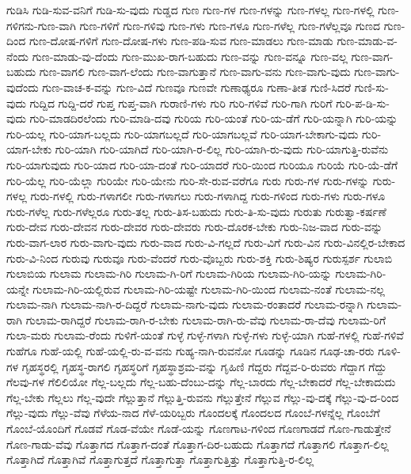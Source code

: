 {ಗುಡಿಸಿ
ಗುಡಿ-ಸುವ-ವನಿಗೆ
ಗುಡಿ-ಸು-ವುದು
ಗುಡ್ಡದ
ಗುಣ
ಗುಣ-ಗಳ
ಗುಣ-ಗಳನ್ನು
ಗುಣ-ಗಳಲ್ಲ
ಗುಣ-ಗಳಲ್ಲಿ
ಗುಣ-ಗಳಿಗನು-ಗುಣ-ವಾಗಿ
ಗುಣ-ಗಳಿಗೆ
ಗುಣ-ಗಳಿವು
ಗುಣ-ಗಳು
ಗುಣ-ಗಳೂ
ಗುಣ-ಗಳೆಲ್ಲ
ಗುಣ-ಗಳೆಲ್ಲವೂ
ಗುಣದ
ಗುಣ-ದಿಂದ
ಗುಣ-ದೋಷ-ಗಳಿಗೆ
ಗುಣ-ದೋಷ-ಗಳು
ಗುಣ-ಪಡಿ-ಸುವ
ಗುಣ-ಮಾಡಲು
ಗುಣ-ಮಾಡು
ಗುಣ-ಮಾಡು-ವ-ನೆಂದು
ಗುಣ-ಮಾಡು-ವು-ದೆಂದು
ಗುಣ-ಮುಖ-ರಾಗ-ಬಹುದು
ಗುಣ-ವನ್ನು
ಗುಣ-ವನ್ನೂ
ಗುಣ-ವಲ್ಲ
ಗುಣ-ವಾಗ-ಬಹುದು
ಗುಣ-ವಾಗಲಿ
ಗುಣ-ವಾಗ-ಲೆಂದು
ಗುಣ-ವಾಗುತ್ತಾನೆ
ಗುಣ-ವಾಗು-ವನು
ಗುಣ-ವಾಗು-ವುದು
ಗುಣ-ವಾಗು-ವುದೆಂದು
ಗುಣ-ವಾಚ-ಕ-ವನ್ನು
ಗುಣ-ವಿದೆ
ಗುಣವೂ
ಗುಣವೇ
ಗುಣಾಢ್ಯರೂ
ಗುಣಾ-ತೀತ
ಗುಣಿ-ಸಿದರೆ
ಗುಣಿ-ಸು-ವುದು
ಗುದ್ದಿದ
ಗುದ್ದಿ-ದರೆ
ಗುಪ್ತ
ಗುಪ್ತ-ವಾಗಿ
ಗುರಾಣಿ-ಗಳು
ಗುರಿ
ಗುರಿ-ಗಳಿವೆ
ಗುರಿ-ಗಾಗಿ
ಗುರಿಗೆ
ಗುರಿ-ಪ-ಡಿ-ಸು-ವುದು
ಗುರಿ-ಮಾಡದಿರಲೆಂದು
ಗುರಿ-ಮಾಡಿ-ದವು
ಗುರಿಯ
ಗುರಿ-ಯಂತೆ
ಗುರಿ-ಯ-ಡೆಗೆ
ಗುರಿ-ಯನ್ನಾಗಿ
ಗುರಿ-ಯನ್ನು
ಗುರಿ-ಯಲ್ಲ
ಗುರಿ-ಯಾಗ-ಬಲ್ಲದು
ಗುರಿ-ಯಾಗಬಲ್ಲದೆ
ಗುರಿ-ಯಾಗಬಲ್ಲವೆ
ಗುರಿ-ಯಾಗ-ಬೇಕಾಗು-ವುದು
ಗುರಿ-ಯಾಗ-ಬೇಕು
ಗುರಿ-ಯಾಗಿ
ಗುರಿ-ಯಾಗಿದೆ
ಗುರಿ-ಯಾಗಿ-ರ-ಲಿಲ್ಲ
ಗುರಿ-ಯಾಗಿ-ರು-ವುದು
ಗುರಿ-ಯಾಗುತ್ತಿ-ರುವೆನು
ಗುರಿ-ಯಾಗುವುದು
ಗುರಿ-ಯಾದ
ಗುರಿ-ಯಾ-ದಂತೆ
ಗುರಿ-ಯಾದರೆ
ಗುರಿ-ಯಿಂದ
ಗುರಿಯೂ
ಗುರಿಯೆ
ಗುರಿ-ಯೆ-ಡೆಗೆ
ಗುರಿ-ಯೆಲ್ಲ
ಗುರಿ-ಯೆಲ್ಲಾ
ಗುರಿಯೇ
ಗುರಿ-ಯೇನು
ಗುರಿ-ಸೇ-ರುವ-ವರೆಗೂ
ಗುರು
ಗುರು-ಗಳ
ಗುರು-ಗಳನ್ನು
ಗುರು-ಗಳಲ್ಲ
ಗುರು-ಗಳಲ್ಲಿ
ಗುರು-ಗಳಾಗಲೀ
ಗುರು-ಗಳಾಗಲು
ಗುರು-ಗಳಾಗಿದ್ದ
ಗುರು-ಗಳಿಂದ
ಗುರು-ಗಳು
ಗುರು-ಗಳೂ
ಗುರು-ಗಳೆಲ್ಲ
ಗುರು-ಗಳೆಲ್ಲರೂ
ಗುರು-ತಲ್ಲ
ಗುರು-ತಿಸ-ಬಹುದು
ಗುರು-ತಿ-ಸು-ವುದು
ಗುರುತು
ಗುರುತ್ವಾ-ಕರ್ಷಣೆ
ಗುರು-ದೇವ
ಗುರು-ದೇವನ
ಗುರು-ದೇವರ
ಗುರು-ದೇವರು
ಗುರು-ದೊರಕ-ಬೇಕು
ಗುರು-ನಿಜ-ವಾದ
ಗುರು-ವನ್ನು
ಗುರು-ವಾಗ-ಲಾರ
ಗುರು-ವಾಗು-ವುದು
ಗುರು-ವಾದ
ಗುರು-ವಿ-ಗಲ್ಲದೆ
ಗುರು-ವಿಗೆ
ಗುರು-ವಿನ
ಗುರು-ವಿನಲ್ಲಿರ-ಬೇಕಾದ
ಗುರು-ವಿ-ನಿಂದ
ಗುರುವು
ಗುರುವೂ
ಗುರು-ವೆಂದರೆ
ಗುರು-ವೊಬ್ಬರು
ಗುರು-ಶಕ್ತಿ
ಗುರು-ಶಿಷ್ಯರ
ಗುರುಸ್ಪರ್ಶ
ಗುಲಾಬಿ
ಗುಲಾಬಿಯ
ಗುಲಾಮ
ಗುಲಾಮ-ಗಿರಿ
ಗುಲಾಮ-ಗಿ-ರಿಗೆ
ಗುಲಾಮ-ಗಿರಿಯ
ಗುಲಾಮ-ಗಿರಿ-ಯನ್ನು
ಗುಲಾಮ-ಗಿರಿ-ಯನ್ನೇ
ಗುಲಾಮ-ಗಿರಿ-ಯಲ್ಲಿರುವ
ಗುಲಾಮ-ಗಿರಿ-ಯಷ್ಟೇ
ಗುಲಾಮ-ಗಿರಿ-ಯಿಂದ
ಗುಲಾಮ-ನಂತೆ
ಗುಲಾಮ-ನಲ್ಲ
ಗುಲಾಮ-ನಾಗಿ
ಗುಲಾಮ-ನಾಗಿ-ರ-ದಿದ್ದರೆ
ಗುಲಾಮ-ನಾಗು-ವುದು
ಗುಲಾಮ-ರಂತಾದರೆ
ಗುಲಾಮ-ರನ್ನಾಗಿ
ಗುಲಾಮ-ರಾಗಿ
ಗುಲಾಮ-ರಾಗಿದ್ದರೆ
ಗುಲಾಮ-ರಾಗಿ-ರ-ಬೇಕು
ಗುಲಾಮ-ರಾಗಿ-ರು-ವೆವು
ಗುಲಾಮ-ರಾ-ದೆವು
ಗುಲಾಮ-ರಿಗೆ
ಗುಲಾ-ಮರು
ಗುಲಾಮ-ರೆಂದು
ಗುಳಿಗೆ-ಯಂತೆ
ಗುಳ್ಳೆ
ಗುಳ್ಳೆ-ಗಳಾಗಿ
ಗುಳ್ಳೆ-ಗಳು
ಗುಳ್ಳೆ-ಯಾಗಿ
ಗುಹೆ-ಗಳಲ್ಲಿ
ಗುಹೆ-ಗಳಿವೆ
ಗುಹೆಗೂ
ಗುಹೆ-ಯಲ್ಲಿ
ಗುಹೆ-ಯಲ್ಲಿ-ರು-ವ-ವನು
ಗುಹ್ಯ-ನಾಗಿ-ರುವನೋ
ಗೂಡನ್ನು
ಗೂಡಿನ
ಗೂಢ-ಚಾ-ರರು
ಗೂಳಿ-ಗಳ
ಗೃಹಸ್ಥರಲ್ಲಿ
ಗೃಹಸ್ಥ-ರಾಗಲಿ
ಗೃಹಸ್ಥರಿಗೆ
ಗೃಹಸ್ಥಾಶ್ರಮ-ವನ್ನು
ಗೃಹಿಣಿ
ಗೆದ್ದರು
ಗೆದ್ದವ-ರಿ-ರುವರು
ಗೆದ್ದಾಗ
ಗೆದ್ದು
ಗೆಲವು-ಗಳ
ಗೆಲಿಲಿಯೋ
ಗೆಲ್ಲ-ಬಲ್ಲದು
ಗೆಲ್ಲ-ಬಹು-ದೆಂಬು-ದನ್ನು
ಗೆಲ್ಲ-ಬಾರದು
ಗೆಲ್ಲ-ಬೇಕಾದರೆ
ಗೆಲ್ಲ-ಬೇಕಾದುದು
ಗೆಲ್ಲ-ಬೇಕು
ಗೆಲ್ಲಲು
ಗೆಲ್ಲ-ವುದೇ
ಗೆಲ್ಲುತ್ತಾನೆ
ಗೆಲ್ಲುತ್ತಿ-ರುವನು
ಗೆಲ್ಲುತ್ತೇನೆ
ಗೆಲ್ಲುವ
ಗೆಲ್ಲು-ವು-ದಕ್ಕೆ
ಗೆಲ್ಲು-ವು-ದ-ರಿಂದ
ಗೆಲ್ಲು-ವುದು
ಗೆಲ್ಲು-ವೆವು
ಗೆಳೆಯ-ನಾದ
ಗೆಳೆ-ಯರಿಬ್ಬರು
ಗೊಂದಲಕ್ಕೆ
ಗೊಂದಲದ
ಗೊಂಬೆ-ಗಳನ್ನೆಲ್ಲ
ಗೊಂಬೆಗೆ
ಗೊಂಬೆ-ಯೊಂದಿಗೆ
ಗೊಡವೆ
ಗೊಡ-ವೆಯೇ
ಗೊಡೆ-ಯನ್ನು
ಗೊಣಗಾಟ-ಗಳಿಂದ
ಗೊಣಗಾಡದೆ
ಗೊಣ-ಗಾಡುತ್ತೇನೆ
ಗೊಣ-ಗಾಡು-ವೆವು
ಗೊತ್ತಾಗದ
ಗೊತ್ತಾಗ-ದಂತೆ
ಗೊತ್ತಾಗ-ದಿರ-ಬಹುದು
ಗೊತ್ತಾಗದೆ
ಗೊತ್ತಾಗಲಿ
ಗೊತ್ತಾಗ-ಲಿಲ್ಲ
ಗೊತ್ತಾಗಿದೆ
ಗೊತ್ತಾಗಿವೆ
ಗೊತ್ತಾಗುತ್ತದೆ
ಗೊತ್ತಾಗುತ್ತಾ
ಗೊತ್ತಾಗುತ್ತಿತ್ತು
ಗೊತ್ತಾಗುತ್ತಿ-ರ-ಲಿಲ್ಲ
}
